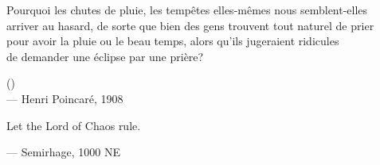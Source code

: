 \begin{flushright}
\itshape
\begin{hangleftquote}{\QFROpen}{\QFRClose}
Pourquoi les chutes de pluie, les tempêtes elles-mêmes nous semblent-elles\\
arriver au hasard, de sorte que bien des gens trouvent tout naturel de prier\\
pour avoir la pluie ou le beau temps, alors qu'ils jugeraient ridicules\\
de demander une éclipse par une prière?
\end{hangleftquote}
\par\smallskip
\normalfont () \\
— Henri Poincaré, 1908
\end{flushright}
\vspace{1em}
\begin{flushright}
\begin{hangleftquote}{\QENOpen}{\QENClose}
Let the Lord of Chaos rule.
\end{hangleftquote}
\par\smallskip
\normalfont — Semirhage, 1000 NE
\end{flushright}
